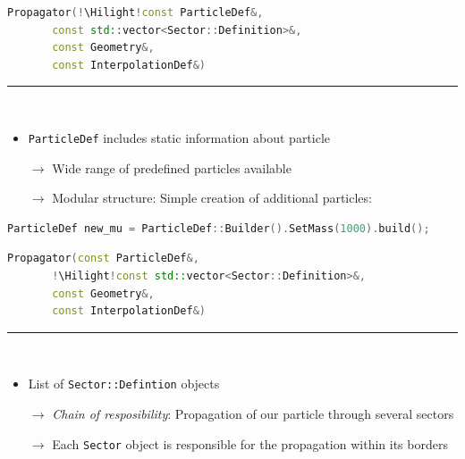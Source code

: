 \documentclass[aspectratio=1610, captions=tableheading, 11pt]{beamer}
\newcommand{\Hilight}{\makebox[0pt][l]{\color{tugreen}\rule[-4pt]{0.65\linewidth}{14pt}}}
\begin{document}
\begin{frame}[fragile]
\begin{lstlisting}[language=C++,basicstyle=\ttfamily,keywordstyle=\color{red}, escapechar=\!]
Propagator(!\Hilight!const ParticleDef&,
	   const std::vector<Sector::Definition>&,
	   const Geometry&,
	   const InterpolationDef&)
\end{lstlisting}
	\textcolor{tugreen}{\rule{\textwidth}{1pt}}\\%
    \begin{itemize}
      \setlength\itemsep{0.5em}
      \item \texttt{ParticleDef} includes static information about particle
      \item [$\rightarrow$] Wide range of predefined particles available 
      \item [$\rightarrow$] Modular structure: Simple creation of additional particles:
    \end{itemize}
\begin{lstlisting}[language=C++,basicstyle=\ttfamily,keywordstyle=\color{red}, escapechar=\!]
    ParticleDef new_mu = ParticleDef::Builder().SetMass(1000).build();
\end{lstlisting}
\end{frame}


\begin{frame}[fragile]
\begin{lstlisting}[language=C++,basicstyle=\ttfamily,keywordstyle=\color{red}, escapechar=\!]
Propagator(const ParticleDef&,
	   !\Hilight!const std::vector<Sector::Definition>&,
	   const Geometry&,
	   const InterpolationDef&)
\end{lstlisting}
	\textcolor{tugreen}{\rule{\textwidth}{1pt}}\\%
    \begin{itemize}
      \setlength\itemsep{0.5em}
      \item List of \texttt{Sector::Defintion} objects
      \item [$\rightarrow$] \emph{Chain of resposibility}: Propagation of our particle through several sectors
      \item [$\rightarrow$] Each \texttt{Sector} object is responsible for the propagation within its borders
    \end{itemize}
\end{frame}
\end{document}
